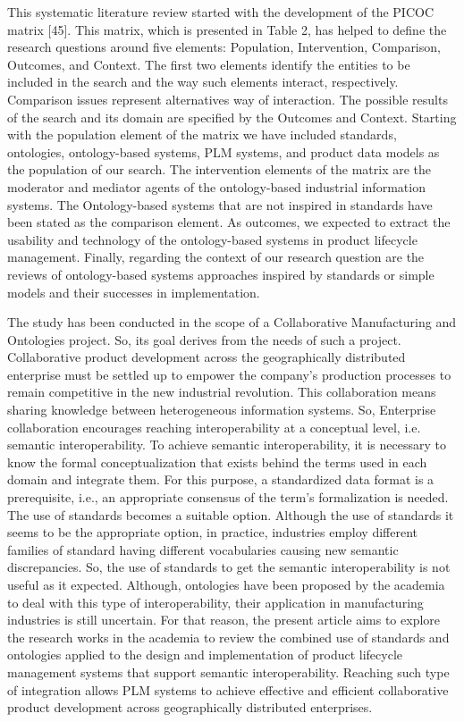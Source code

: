 \documentclass[peerreview]{IEEEtran}
\begin{document}
This systematic literature review started with the development of the PICOC matrix [45]. This matrix, which is presented in Table 2, has helped to define the research questions around five elements: Population, Intervention, Comparison, Outcomes, and Context. The first two elements identify the entities to be included in the search and the way such elements interact, respectively. Comparison issues represent alternatives way of interaction. The possible results of the search and its domain are specified by the Outcomes and Context. Starting with the population element of the matrix we have included standards, ontologies, ontology-based systems, PLM systems, and product data models as the population of our search. The intervention elements of the matrix are the moderator and mediator agents of the ontology-based industrial information systems. The Ontology-based systems that are not inspired in standards have been stated as the comparison element. As outcomes, we expected to extract the usability and technology of the ontology-based systems in product lifecycle management. Finally, regarding the context of our research question are the reviews of ontology-based systems approaches inspired by standards or simple models and their successes in implementation.


The study has been conducted in the scope of a Collaborative Manufacturing and Ontologies project. So, its goal derives from the needs of such a project. Collaborative product development across the geographically distributed enterprise must be settled up to empower the company’s production processes to remain competitive in the new industrial revolution. This collaboration means sharing knowledge between heterogeneous information systems. So, Enterprise collaboration encourages reaching interoperability at a conceptual level, i.e. semantic interoperability. To achieve semantic interoperability, it is necessary to know the formal conceptualization that exists behind the terms used in each domain and integrate them. For this purpose, a standardized data format is a prerequisite, i.e., an appropriate consensus of the term’s formalization is needed. The use of standards becomes a suitable option. Although the use of standards it seems to be the appropriate option, in practice, industries employ different families of standard having different vocabularies causing new semantic discrepancies. So, the use of standards to get the semantic interoperability is not useful as it expected. Although, ontologies have been proposed by the academia to deal with this type of interoperability, their application in manufacturing industries is still uncertain. For that reason, the present article aims to explore the research works in the academia to review the combined use of standards and ontologies applied to the design and implementation of product lifecycle management systems that support semantic interoperability. Reaching such type of integration allows PLM systems to achieve effective and efficient collaborative product development across geographically distributed enterprises.
\end{document}
